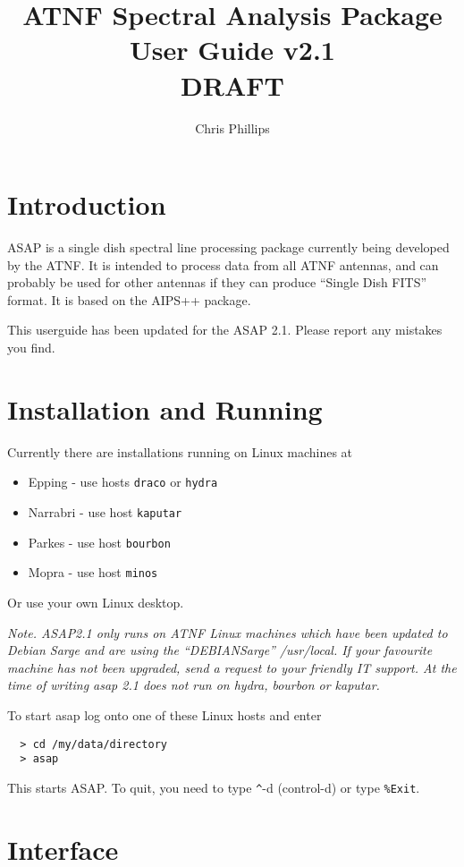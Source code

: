 \documentclass[11pt]{article}
\title{ATNF Spectral Analysis Package\\User Guide v2.1\\DRAFT }
\author{Chris Phillips}
\newcommand{\cmd}[1]{{\tt #1}}
\begin{document}
\maketitle

\section{Introduction}

ASAP is a single dish spectral line processing package currently being
developed by the ATNF. It is intended to process data from all ATNF
antennas, and can probably be used for other antennas if they can
produce ``Single Dish FITS'' format. It is based on the AIPS++
package.

This userguide has been updated for the ASAP 2.1. Please report any
mistakes you find.

\section{Installation and Running}

Currently there are installations running on Linux machines at

\begin{itemize}
\item Epping - use hosts {\tt draco} or {\tt hydra}
\item Narrabri - use host {\tt kaputar}
\item Parkes - use host {\tt bourbon}
\item Mopra - use host {\tt minos}
\end{itemize}

Or use your own Linux desktop.

{\em Note. ASAP2.1 only runs on ATNF Linux machines which have been
updated to Debian Sarge and are using the ``DEBIANSarge''
/usr/local. If your favourite machine has not been upgraded, send a
request to your friendly IT support. At the time of writing asap 2.1
does not run on hydra, bourbon or kaputar.}

To start asap log onto one of these Linux hosts and enter

\begin{verbatim}
  > cd /my/data/directory
  > asap
\end{verbatim}

This starts ASAP. To quit, you need to type \verb+^+-d (control-d) or
type \cmd{\%Exit}.

\section{Interface}
\end{document}
